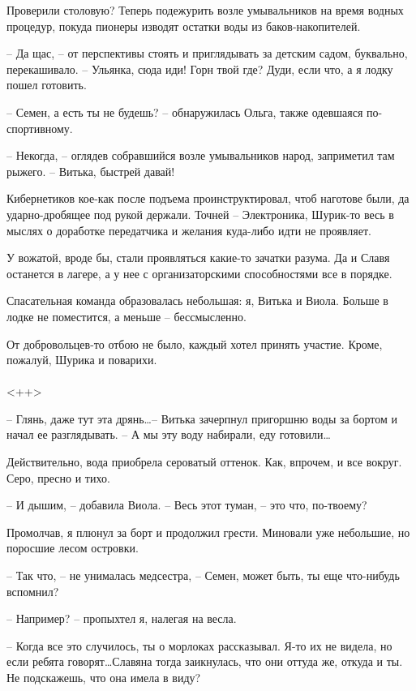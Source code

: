 \documentclass[a4paper]{book}
\begin{document}
Проверили столовую? Теперь подежурить возле умывальников на время водных процедур, покуда пионеры изводят остатки воды из баков-накопителей.

-- Да щас, -- от перспективы стоять и приглядывать за детским садом, буквально, перекашивало. -- Ульянка, сюда иди! Горн твой где? Дуди, если что, а я лодку пошел готовить.

-- Семен, а есть ты не будешь? -- обнаружилась  Ольга, также одевшаяся по-спортивному.

-- Некогда, -- оглядев собравшийся возле умывальников народ, заприметил там рыжего. -- Витька, быстрей давай!

Кибернетиков кое-как после подъема проинструктировал, чтоб наготове были, да ударно-дробящее под рукой держали. Точней -- Электроника, Шурик-то весь в мыслях о доработке передатчика и желания куда-либо идти не проявляет. 

У вожатой, вроде бы, стали проявляться какие-то зачатки разума. Да и Славя останется в лагере, а у нее с организаторскими способностями все в порядке.

Спасательная команда образовалась небольшая: я, Витька и Виола. Больше в лодке не поместится, а меньше -- бессмысленно. 

От добровольцев-то отбою не было, каждый хотел принять участие. Кроме, пожалуй, Шурика и поварихи.

\paragraph{}<++>

-- Глянь, даже тут эта дрянь\ldots -- Витька зачерпнул пригоршню воды за бортом и начал ее разглядывать. -- А мы эту воду набирали, еду готовили\ldots 

Действительно, вода приобрела сероватый оттенок. Как, впрочем, и все вокруг. Серо, пресно и тихо.

-- И дышим, -- добавила Виола. -- Весь этот туман, -- это что, по-твоему? 

Промолчав, я плюнул за борт и продолжил грести. Миновали уже небольшие, но поросшие лесом островки. 

-- Так что, -- не унималась медсестра, -- Семен, может быть, ты еще что-нибудь вспомнил? 

-- Например? -- пропыхтел я, налегая на весла.

-- Когда все это случилось, ты о морлоках рассказывал. Я-то их не видела, но если ребята говорят\ldots Славяна тогда заикнулась, что они оттуда же, откуда и ты. Не подскажешь, что она имела в виду?
\end{document}
